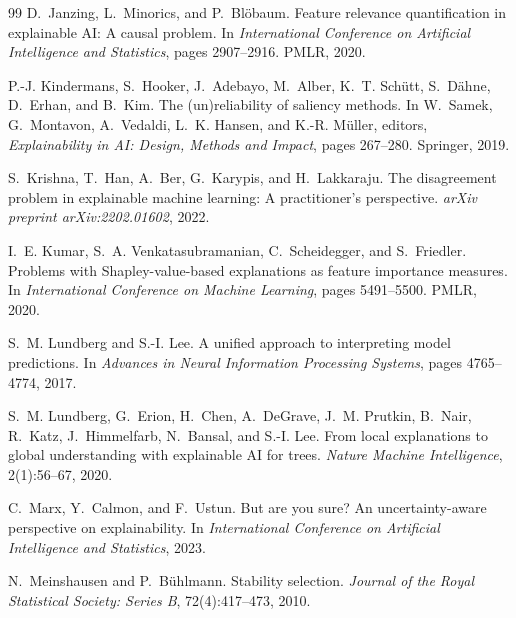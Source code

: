 \documentclass[11pt]{article}
\begin{document}
\begin{thebibliography}{99}
D.~Janzing, L.~Minorics, and P.~Bl{\"o}baum.
\newblock Feature relevance quantification in explainable {AI}: A causal
  problem.
\newblock In \emph{International Conference on Artificial Intelligence and
  Statistics}, pages 2907--2916. PMLR, 2020.

P.-J. Kindermans, S.~Hooker, J.~Adebayo, M.~Alber, K.~T. Sch{\"u}tt,
  S.~D{\"a}hne, D.~Erhan, and B.~Kim.
\newblock The (un)reliability of saliency methods.
\newblock In W.~Samek, G.~Montavon, A.~Vedaldi, L.~K. Hansen, and K.-R.
  M{\"u}ller, editors, \emph{Explainability in AI: Design, Methods and Impact},
  pages 267--280. Springer, 2019.

S.~Krishna, T.~Han, A.~Ber, G.~Karypis, and H.~Lakkaraju.
\newblock The disagreement problem in explainable machine learning: A
  practitioner's perspective.
\newblock \emph{arXiv preprint arXiv:2202.01602}, 2022.

I.~E. Kumar, S.~A. Venkatasubramanian, C.~Scheidegger, and S.~Friedler.
\newblock Problems with {S}hapley-value-based explanations as feature importance
  measures.
\newblock In \emph{International Conference on Machine Learning}, pages
  5491--5500. PMLR, 2020.

S.~M. Lundberg and S.-I. Lee.
\newblock A unified approach to interpreting model predictions.
\newblock In \emph{Advances in Neural Information Processing Systems}, pages
  4765--4774, 2017.

S.~M. Lundberg, G.~Erion, H.~Chen, A.~DeGrave, J.~M. Prutkin, B.~Nair,
  R.~Katz, J.~Himmelfarb, N.~Bansal, and S.-I. Lee.
\newblock From local explanations to global understanding with explainable {AI}
  for trees.
\newblock \emph{Nature Machine Intelligence}, 2(1):56--67, 2020.

C.~Marx, Y.~Calmon, and F.~Ustun.
\newblock But are you sure? An uncertainty-aware perspective on explainability.
\newblock In \emph{International Conference on Artificial Intelligence and
  Statistics}, 2023.

N.~Meinshausen and P.~B{\"u}hlmann.
\newblock Stability selection.
\newblock \emph{Journal of the Royal Statistical Society: Series B},
  72(4):417--473, 2010.


\end{thebibliography}
\end{document}

